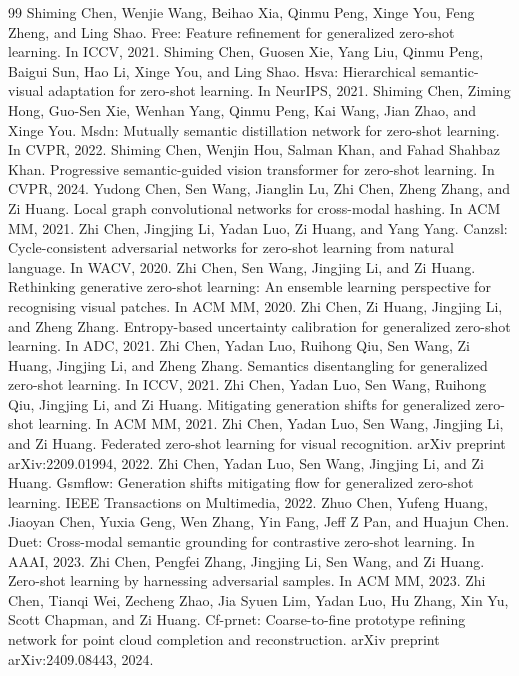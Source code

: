 \begin{thebibliography}{99}
 Shiming Chen, Wenjie Wang, Beihao Xia, Qinmu Peng, Xinge You, Feng Zheng, and Ling Shao. Free: Feature refinement for generalized zero-shot learning. In ICCV, 2021.
 Shiming Chen, Guosen Xie, Yang Liu, Qinmu Peng, Baigui Sun, Hao Li, Xinge You, and Ling Shao. Hsva: Hierarchical semantic-visual adaptation for zero-shot learning. In NeurIPS, 2021.
 Shiming Chen, Ziming Hong, Guo-Sen Xie, Wenhan Yang, Qinmu Peng, Kai Wang, Jian Zhao, and Xinge You. Msdn: Mutually semantic distillation network for zero-shot learning. In CVPR, 2022.
 Shiming Chen, Wenjin Hou, Salman Khan, and Fahad Shahbaz Khan. Progressive semantic-guided vision transformer for zero-shot learning. In CVPR, 2024.
 Yudong Chen, Sen Wang, Jianglin Lu, Zhi Chen, Zheng Zhang, and Zi Huang. Local graph convolutional networks for cross-modal hashing. In ACM MM, 2021.
 Zhi Chen, Jingjing Li, Yadan Luo, Zi Huang, and Yang Yang. Canzsl: Cycle-consistent adversarial networks for zero-shot learning from natural language. In WACV, 2020.
 Zhi Chen, Sen Wang, Jingjing Li, and Zi Huang. Rethinking generative zero-shot learning: An ensemble learning perspective for recognising visual patches. In ACM MM, 2020.
 Zhi Chen, Zi Huang, Jingjing Li, and Zheng Zhang. Entropy-based uncertainty calibration for generalized zero-shot learning. In ADC, 2021.
 Zhi Chen, Yadan Luo, Ruihong Qiu, Sen Wang, Zi Huang, Jingjing Li, and Zheng Zhang. Semantics disentangling for generalized zero-shot learning. In ICCV, 2021.
 Zhi Chen, Yadan Luo, Sen Wang, Ruihong Qiu, Jingjing Li, and Zi Huang. Mitigating generation shifts for generalized zero-shot learning. In ACM MM, 2021.
 Zhi Chen, Yadan Luo, Sen Wang, Jingjing Li, and Zi Huang. Federated zero-shot learning for visual recognition. arXiv preprint arXiv:2209.01994, 2022.
 Zhi Chen, Yadan Luo, Sen Wang, Jingjing Li, and Zi Huang. Gsmflow: Generation shifts mitigating flow for generalized zero-shot learning. IEEE Transactions on Multimedia, 2022.
 Zhuo Chen, Yufeng Huang, Jiaoyan Chen, Yuxia Geng, Wen Zhang, Yin Fang, Jeff Z Pan, and Huajun Chen. Duet: Cross-modal semantic grounding for contrastive zero-shot learning. In AAAI, 2023.
 Zhi Chen, Pengfei Zhang, Jingjing Li, Sen Wang, and Zi Huang. Zero-shot learning by harnessing adversarial samples. In ACM MM, 2023.
 Zhi Chen, Tianqi Wei, Zecheng Zhao, Jia Syuen Lim, Yadan Luo, Hu Zhang, Xin Yu, Scott Chapman, and Zi Huang. Cf-prnet: Coarse-to-fine prototype refining network for point cloud completion and reconstruction. arXiv preprint arXiv:2409.08443, 2024.

\end{thebibliography}
